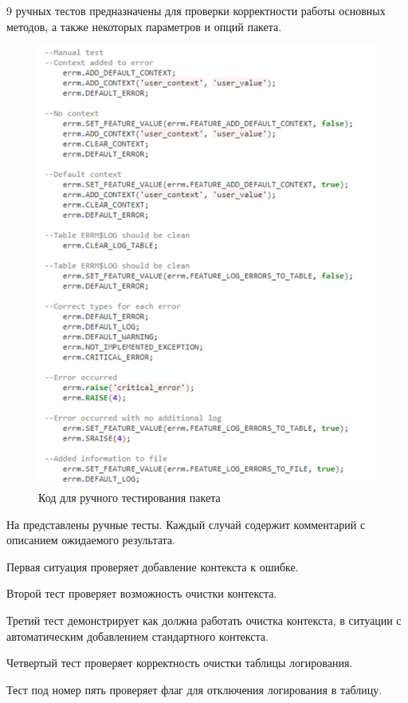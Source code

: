 9 ручных тестов предназначены для проверки корректности работы основных методов, а также некоторых параметров и опций пакета.

\begin{figure}[ht!] 
	\center
	\includegraphics [scale=1] {my_folder/img/c4_manual_test.png}
	\caption{Код для ручного тестирования пакета} 
	\label{fig:c4_manual_test}  
\end{figure}
\FloatBarrier

На  представлены ручные тесты. Каждый случай содержит комментарий с описанием ожидаемого результата.

Первая ситуация проверяет добавление контекста к ошибке.
 
Второй тест проверяет возможность очистки контекста. 

Третий тест демонстрирует как должна работать очистка контекста, в ситуации с автоматическим добавлением стандартного контекста. 

Четвертый тест проверяет корректность очистки таблицы логирования.

Тест под номер пять проверяет флаг для отключения логирования в таблицу. 

